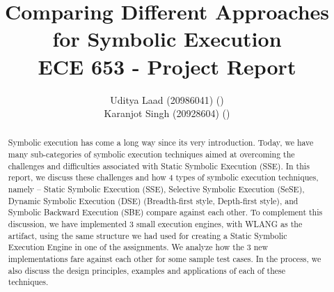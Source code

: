 \documentclass[11pt]{llncs}
\begin{document}
%
\title{Comparing Different Approaches for Symbolic Execution\\ ECE 653 - Project Report}
%
%
\author{Uditya Laad (20986041) ()
\\Karanjot Singh (20928604) ()}
%
%

%
\maketitle              %
%

\vspace{-6mm}


\begin{abstract}
	Symbolic execution has come a long way since its very introduction. Today, we have many sub-categories of symbolic execution techniques aimed at overcoming the challenges and difficulties associated with Static Symbolic Execution (SSE). In this report, we discuss these challenges and how 4 types of symbolic execution techniques, namely – Static Symbolic Execution (SSE), Selective Symbolic Execution (SeSE), Dynamic Symbolic Execution (DSE) (Breadth-first style, Depth-first style), and Symbolic Backward Execution (SBE) compare against each other. To complement this discussion, we have implemented 3 small execution engines, with WLANG as the artifact, using the same structure we had used for creating a Static Symbolic Execution Engine in one of the assignments. We analyze how the 3 new implementations fare against each other for some sample test cases. In the process, we also discuss the design principles, examples and applications of each of these techniques.

\end{abstract}

\vspace{-17mm}
	
\end{document}

